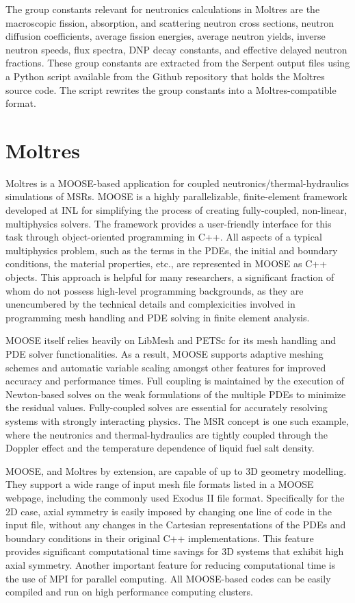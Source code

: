 The group constants relevant for neutronics calculations in Moltres are the
macroscopic fission, absorption, and scattering neutron cross sections,
neutron diffusion coefficients, average fission energies, average neutron
yields, inverse neutron speeds, flux spectra, \gls{DNP} decay constants, and
effective delayed neutron fractions. These group constants are extracted from
the Serpent output files using a Python script available from the Github
repository that holds the Moltres source code. The script rewrites the group
constants into a Moltres-compatible format.

\section{Moltres}

Moltres is a \gls{MOOSE}-based application for coupled
neutronics/thermal-hydraulics simulations of \glspl{MSR}. \gls{MOOSE} is a
highly parallelizable,
finite-element framework developed at \gls{INL} for simplifying the process of
creating fully-coupled, non-linear, multiphysics solvers. The framework
provides a user-friendly interface for this task through object-oriented
programming in C++. All aspects of a typical multiphysics problem, such as the
terms in the \glspl{PDE}, the initial and boundary conditions, the material
properties, etc., are represented in \gls{MOOSE} as C++ objects. This approach
is helpful for many researchers, a significant fraction of whom do not possess
high-level programming backgrounds, as they are unencumbered by the
technical details and complexicities involved in programming mesh handling
and \gls{PDE} solving in finite element analysis.

\gls{MOOSE} itself relies heavily on LibMesh and PETSc for
its mesh handling and \gls{PDE} solver functionalities. As a result,
\gls{MOOSE} supports adaptive meshing schemes and automatic variable scaling
amongst other features for improved accuracy and performance times. Full
coupling is maintained by the execution of Newton-based solves on the
weak formulations of the multiple \glspl{PDE} to minimize the residual values.
Fully-coupled solves are essential for accurately resolving systems with
strongly interacting physics. The \gls{MSR} concept is one such example, where
the neutronics and thermal-hydraulics are tightly coupled through the Doppler
effect and the temperature dependence of liquid fuel salt density.

\gls{MOOSE}, and Moltres by extension, are capable of up to 3D geometry
modelling. They support a wide range of input mesh file formats listed in a
\gls{MOOSE} webpage, including the commonly used Exodus II file format.
Specifically for the 2D case, axial symmetry is easily imposed by changing
one line of code in the input file, without any changes in the Cartesian
representations of the \glspl{PDE} and boundary conditions in their original
C++ implementations. This feature provides significant computational time
savings for 3D systems that exhibit high axial symmetry. Another important
feature for reducing computational time is the use of MPI for parallel
computing. All \gls{MOOSE}-based codes can be easily compiled and run on high
performance computing clusters.

